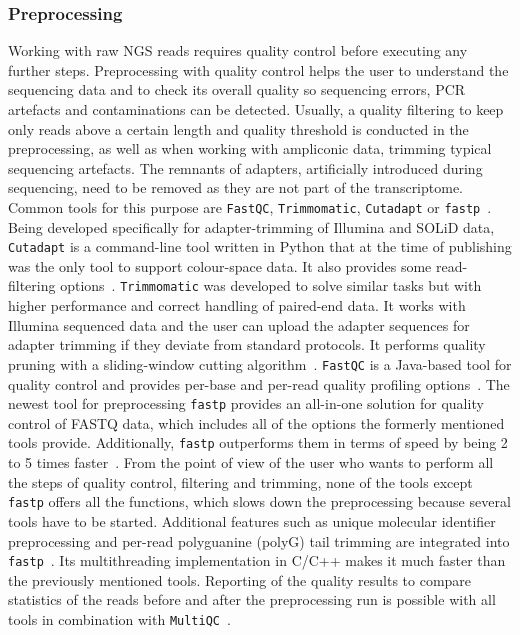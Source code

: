 \subsubsection*{Preprocessing}
Working with raw \ac{NGS} reads requires quality control before executing any further steps. Preprocessing with quality control helps the user to understand the sequencing data and to check its overall quality so sequencing errors, \ac{PCR} artefacts and contaminations can be detected. Usually, a quality filtering to keep only reads above a certain length and quality threshold is conducted in the preprocessing, as well as when working with ampliconic data, trimming typical sequencing artefacts. The remnants of adapters, artificially introduced during sequencing, need to be removed as they are not part of the transcriptome. Common tools for this purpose are \texttt{FastQC}, \texttt{Trimmomatic}, \texttt{Cutadapt} or \texttt{fastp}~\cite{andrews2010fastqc, bolger2014trimmomatic, martin2011cutadapt, chen2018fastp}. Being developed specifically for adapter-trimming of Illumina and SOLiD data, \texttt{Cutadapt} is a command-line tool written in Python that at the time of publishing was the only tool to support colour-space data. It also provides some read-filtering options~\cite{martin2011cutadapt}. \texttt{Trimmomatic} was developed to solve similar tasks but with higher performance and correct handling of paired-end data. It works with Illumina sequenced data and the user can upload the adapter sequences for adapter trimming if they deviate from standard protocols. It performs quality pruning with a sliding-window cutting algorithm~\cite{bolger2014trimmomatic}. \texttt{FastQC} is a Java-based tool for quality control and provides per-base and per-read quality profiling options~\cite{andrews2010fastqc}. The newest tool for preprocessing \texttt{fastp} provides an all-in-one solution for quality control of FASTQ data, which includes all of the options the formerly mentioned tools provide. Additionally, \texttt{fastp} outperforms them in terms of speed by being 2 to 5 times faster~\cite{chen2018fastp}. From the point of view of the user who wants to perform all the steps of quality control, filtering and trimming, none of the tools except \texttt{fastp} offers all the functions, which slows down the preprocessing because several tools have to be started. Additional features such as unique molecular identifier preprocessing and per-read polyguanine (polyG) tail trimming are integrated into \texttt{fastp}~\cite{chen2018fastp}. Its multithreading implementation in C/C++ makes it much faster than the previously mentioned tools. Reporting of the quality results to compare statistics of the reads before and after the preprocessing run is possible with all tools in combination with \texttt{MultiQC}~\cite{ewels2016multiqc}.


